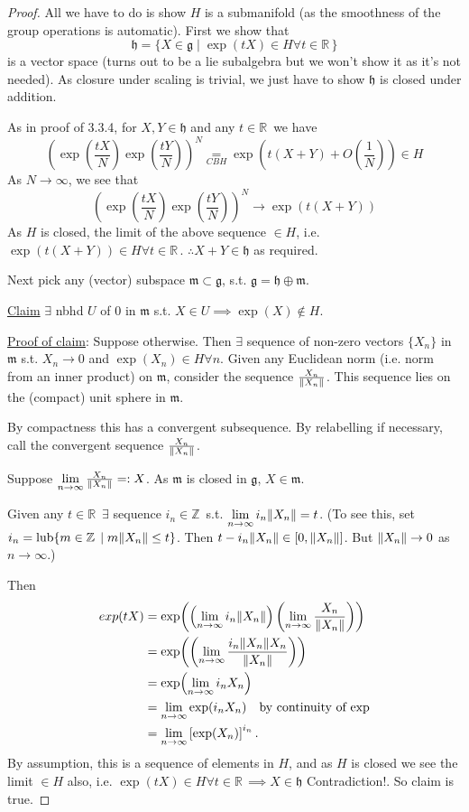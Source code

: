 \documentclass[12pt,a4paper]{article}
\newcommand{\zZ}{\ensuremath{\mathbb{Z}\,}}
\newcommand{\rR}{\ensuremath{\mathbb{R}\,}}
\newcommand{\lalg}{\ensuremath{\mathfrak{g}}}
\newcommand{\lall}[1]{\ensuremath{\mathfrak{#1}}}
\newcommand{\ul}[1]{\underline{#1}}
\begin{document}
\begin{proof}
All we have to do is show $H$ is a submanifold (as the smoothness of the group operations is automatic). First we show that
\[\lall{h}=\{X\in \lalg\mid \exp(tX)\in H \forall t \in \rR\}\]
is a vector space (turns out to be a lie subalgebra but we won't show it as it's not needed). As closure under scaling is trivial, we just have to show \lall{h} is closed under addition.

As in proof of 3.3.4, for $X,Y \in \lall{h}$ and any $t\in \rR$ we have
\[\left(\exp(\frac{tX}{N})\exp(\frac{tY}{N})\right)^N\underset{CBH}{=}\exp(t(X+Y)+O(\frac{1}{N}))\in H\]
As $N\to \infty$, we see that 
\[\left(\exp(\frac{tX}{N})\exp(\frac{tY}{N})\right)^N\to \exp(t(X+Y))\]
As $H$ is closed, the limit of the above sequence $\in H$, i.e. $\exp(t(X+Y))\in H \forall t \in \rR$. 
$\therefore X+Y\in \lall{h}$ as required.

Next pick any (vector) subspace $\lall{m}\subset \lalg$, s.t. $\lalg=\lall{h}\oplus \lall{m}$.

\ul{Claim} $\exists$ nbhd $U$ of $0$ in $\lall{m}$ s.t. $X\in U\implies \exp(X)\not\in H$.

\ul{Proof of claim}: Suppose otherwise. Then $\exists$ sequence of non-zero vectors $\{X_n\}$ in \lall{m} s.t. $X_n\to 0$ and $\exp(X_n)\in H \forall n$. 
Given any Euclidean norm (i.e. norm from an inner product) on $\lall{m}$, consider the sequence $\frac{X_n}{\norm{X_n}}$. This sequence lies on the (compact) unit sphere in \lall{m}. 

By compactness this has a convergent subsequence. By relabelling if necessary, call the convergent sequence $\frac{X_n}{\norm{X_n}}$.

Suppose $\lim\limits_{n\to\infty}\frac{X_n}{\norm{X_n}}=:X$. As $\lall{m}$ is closed in \lalg, $X\in \lall{m}$.

Given any $t\in \rR$ $\exists$ sequence $i_n\in \zZ$ s.t. $\lim\limits_{n\to \infty}i_n\norm{X_n}=t$. (To see this, set $i_n=\operatorname{lub}\{m\in \zZ\mid m\norm{X_n}\leq t\}$. Then $t-i_n\norm{X_n}\in \left[0,\norm{X_n}\right]$. But $\norm{X_n}\to 0$ as $n\to \infty$.)

Then 
\begin{align*}
exp(tX)&=\exp(\left(\lim\limits_{n\to\infty} i_n\norm{X_n}\right) \left(\lim\limits_{n\to\infty} \frac{X_n}{\norm{X_n}}\right))\\
&=\exp(\left(\lim\limits_{n\to\infty} \frac{i_n\norm{X_n}X_n}{\norm{X_n}}\right))\\
&=\exp(\lim_{n\to\infty} i_nX_n)\\
&=\lim_{n\to\infty} \exp(i_n X_n) \quad \text{by continuity of exp}\\
&= \lim_{n\to \infty}\left[\exp(X_n)\right]^{i_n}.
\end{align*}
By assumption, this is a sequence of elements in $H$, and as $H$ is closed we see the limit $\in H$ also, i.e. $\exp(tX)\in H \forall t\in \rR \implies X\in \lall{h}$ Contradiction!. So claim is true.


\end{proof}
\end{document}

